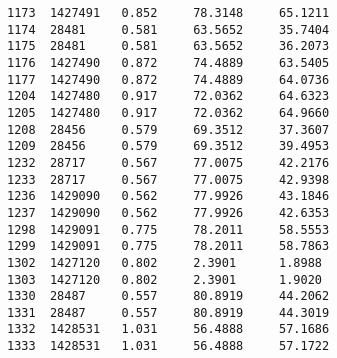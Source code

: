 \documentclass[notitlepage,rmp,aps,10pt]{revtex4-1}
\begin{document}
\begin{verbatim}
1173  1427491   0.852     78.3148     65.1211
1174  28481     0.581     63.5652     35.7404
1175  28481     0.581     63.5652     36.2073
1176  1427490   0.872     74.4889     63.5405
1177  1427490   0.872     74.4889     64.0736
1204  1427480   0.917     72.0362     64.6323
1205  1427480   0.917     72.0362     64.9660
1208  28456     0.579     69.3512     37.3607
1209  28456     0.579     69.3512     39.4953
1232  28717     0.567     77.0075     42.2176
1233  28717     0.567     77.0075     42.9398
1236  1429090   0.562     77.9926     43.1846
1237  1429090   0.562     77.9926     42.6353
1298  1429091   0.775     78.2011     58.5553
1299  1429091   0.775     78.2011     58.7863
1302  1427120   0.802     2.3901      1.8988
1303  1427120   0.802     2.3901      1.9020
1330  28487     0.557     80.8919     44.2062
1331  28487     0.557     80.8919     44.3019
1332  1428531   1.031     56.4888     57.1686
1333  1428531   1.031     56.4888     57.1722
\end{verbatim}


\newpage
\end{document}
